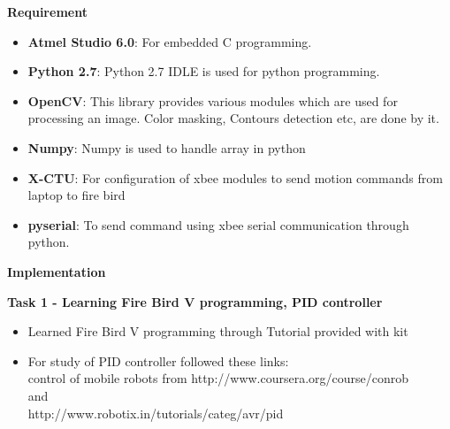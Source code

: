 \documentclass[report]{res}
\begin{document}
	
	
	\begin{center}
		{\huge\textbf{Requirement}\par}
	\end{center}
	
	\begin{itemize}
		\item \textbf{Atmel Studio 6.0}: For embedded C programming. 
		\item \textbf{Python 2.7}: Python 2.7 IDLE is used for python programming. 
		\item \textbf{OpenCV}: This library provides various modules which are used for processing an image. Color masking, Contours detection etc, are done by it.
		\item \textbf{Numpy}: Numpy is used to handle array in python
		\item \textbf{X-CTU}: For configuration of xbee modules to send motion commands from laptop to fire bird
		\item \textbf{pyserial}: To send command using xbee serial communication through python.
	\end{itemize}
	
	\pagebreak	
	
	
	\begin{center}
		{\huge\textbf{Implementation}\par}
	\end{center}
	
	{\Large \textbf{Task 1 - Learning Fire Bird V programming, PID controller}\par} 
	\begin{itemize}
		\item Learned Fire Bird V programming through Tutorial provided with kit \item For study of PID controller followed these links: \\
		control of mobile robots from 
		http://www.coursera.org/course/conrob\\
		and\\
		http://www.robotix.in/tutorials/categ/avr/pid\\
	\end{itemize}
	
\end{document}
